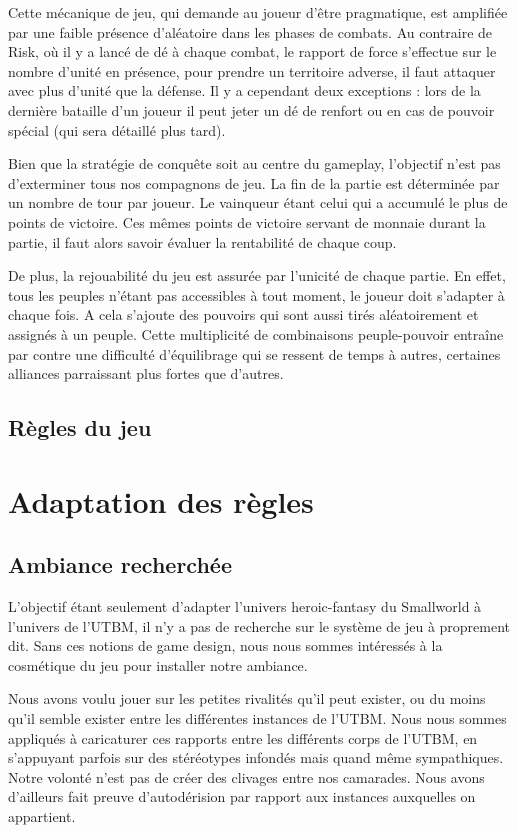 \documentclass[11pt]{report}
\begin{document}
		Cette mécanique de jeu, qui demande au joueur d'être pragmatique, est amplifiée par une faible présence d'aléatoire dans les phases de combats. Au contraire de Risk\up{\copyright}, où il y a lancé de dé à chaque combat, le rapport de force s'effectue sur le nombre d'unité en présence, pour prendre un territoire adverse, il faut attaquer avec plus d'unité que la défense. Il y a cependant deux exceptions : lors de la dernière bataille d'un joueur il peut jeter un dé de renfort ou en cas de pouvoir spécial (qui sera détaillé plus tard).
		
		Bien que la stratégie de conquête soit au centre du gameplay, l'objectif n'est pas d'exterminer tous nos compagnons de jeu. La fin de la partie est déterminée par un nombre de tour par joueur. Le vainqueur étant celui qui a accumulé le plus de points de victoire. Ces mêmes points de victoire servant de monnaie durant la partie, il faut alors savoir évaluer la rentabilité de chaque coup. 
		
		De plus, la rejouabilité du jeu est assurée par l'unicité de chaque partie. En effet, tous les peuples n'étant pas accessibles à tout moment, le joueur doit s'adapter à chaque fois. A cela s'ajoute des pouvoirs qui sont aussi tirés aléatoirement et assignés à un peuple. Cette multiplicité de combinaisons peuple-pouvoir entraîne par contre une difficulté d'équilibrage qui se ressent de temps à autres, certaines alliances parraissant plus fortes que d'autres.
	\section{Règles du jeu}

\chapter{Adaptation des règles}

	\section{Ambiance recherchée}
	
	L'objectif étant seulement d'adapter l'univers heroic-fantasy du Smallworld\up{\copyright} à l'univers de l'UTBM, il n'y a pas de recherche sur le système de jeu à proprement dit. Sans ces notions de game design, nous nous sommes intéressés à la cosmétique du jeu pour installer notre ambiance. 
	
	Nous avons voulu jouer sur les petites rivalités qu'il peut exister, ou du moins qu'il semble exister entre les différentes instances de l'UTBM. Nous nous sommes appliqués à caricaturer ces rapports entre les différents corps de l'UTBM, en s'appuyant parfois sur des stéréotypes infondés mais quand même sympathiques. Notre volonté n'est pas de créer des clivages entre nos camarades. Nous avons d'ailleurs fait preuve d'autodérision par rapport aux instances auxquelles on appartient. 
	
\end{document}
